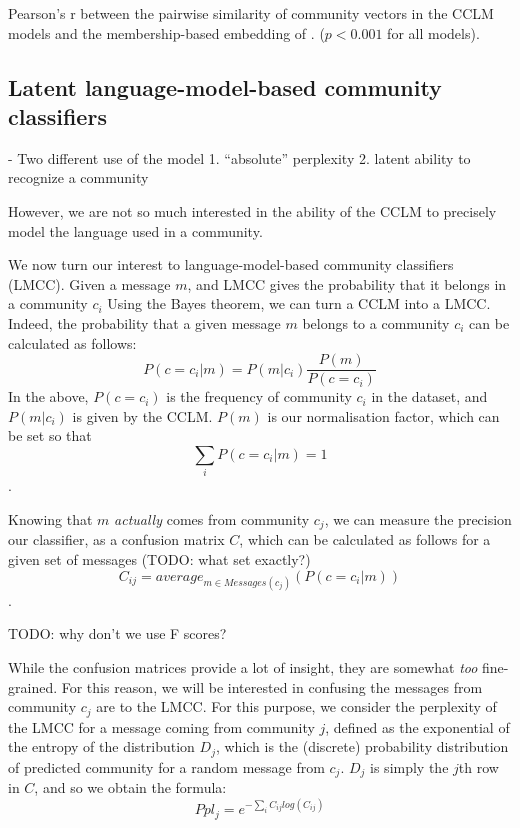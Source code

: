 \documentclass[11pt,a4paper]{article}
\begin{document}
\begin{table}
  \centering
  
  \caption{Pearson's r between the pairwise similarity of community vectors
  in the CCLM models and the membership-based embedding of \citet{Kumar2018}.
  ($p<0.001$ for all models).
  }
  \label{tab:pairwise-comm-sim}
\end{table}

\subsection{Latent language-model-based community classifiers}

- Two different use of the model
1. ``absolute'' perplexity
2. latent ability to recognize a community


However, we are not so much interested in the ability of the CCLM to
precisely model the language used in a community.

We now turn our interest to language-model-based community classifiers
(LMCC). Given a message $m$, and LMCC gives the probability that it
belongs in a community $c_i$ Using the Bayes theorem, we can turn a
CCLM into a LMCC. Indeed, the probability that a given message $m$
belongs to a community $c_i$ can be calculated as follows:
\[P(c=c_i | m) = P(m | c_i)\frac {P(m)} {P(c=c_i)}\]
In the above,
$P(c=c_i)$ is the frequency of community $c_i$ in the dataset, and
$P(m | c_i)$ is given by the CCLM. $P(m)$ is our normalisation factor, which can be set so that
\[\sum_i P(c=c_i | m) = 1\].

Knowing that $m$ \emph{actually} comes from community $c_j$, we can
measure the precision our classifier, as a confusion matrix $C$,
which can be calculated as follows for a given set of messages (TODO: what set exactly?)
\[C_{ij} = average_{m \in Messages(c_j)}(P(c=c_i | m))\].




TODO: why don't we use F scores?

While the confusion matrices provide a lot of insight, they are
somewhat \emph{too} fine-grained. For this reason, we will be
interested in confusing the messages from community $c_j$ are to the
LMCC. For this purpose, we consider the perplexity of the LMCC for a
message coming from community $j$, defined as the exponential of the
entropy of the distribution \(D_j\), which is the (discrete)
probability distribution of predicted community for a random message from
$c_j$. $D_j$ is simply the $j$th row in \(C\), and so we obtain the formula:
\[Ppl_j = e^{-\sum_i C_{ij} log(C_{ij})}\]
\end{document}
